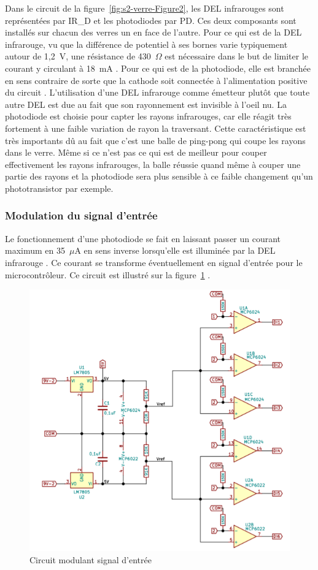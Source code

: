 Dans le circuit de la figure~\ref{fig:s2-verre-Figure2}, les DEL infrarouges sont représentées par IR\_D et les photodiodes par PD.
Ces deux composants sont installés sur chacun des verres un en face de l’autre.
Pour ce qui est de la DEL infrarouge, vu que la différence de potentiel à ses bornes varie typiquement autour de 1,2~V, une résistance de 430~$\Omega$ est nécessaire dans le but de limiter le courant y circulant à 18~mA \cite{everlight_americas_datasheet_2014}.
Pour ce qui est de la photodiode, elle est branchée en sens contraire de sorte que la cathode soit connectée à l’alimentation positive du circuit \cite{sharp_application_1999}.
L’utilisation d’une DEL infrarouge comme émetteur plutôt que toute autre DEL est due au fait que son rayonnement est invisible à l'oeil nu.
La photodiode est choisie pour capter les rayons infrarouges, car elle réagit très fortement à une faible variation de rayon la traversant.
Cette caractéristique est très importants dû au fait que c’est une balle de ping-pong qui coupe les rayons dans le verre.
Même si ce n’est pas ce qui est de meilleur pour couper effectivement les rayons infrarouges, la balle réussie quand même à couper une partie des rayons et la photodiode sera plus sensible à ce faible changement qu’un phototransistor par exemple.

\subsubsection{Modulation du signal d’entrée}

Le fonctionnement d’une photodiode se fait en laissant passer un courant maximum en 35~$\mu$A en sens inverse lorsqu’elle est illuminée par la DEL infrarouge \cite{everlight_americas_datasheet_2016}.
Ce courant se transforme éventuellement en signal d’entrée pour le microcontrôleur.
Ce circuit est illustré sur la figure~\ref{fig:s2-verre-Figure5} \cite{sharp_application_1999}.

\begin{figure}[t]
    \centering
    \includegraphics[width=0.8\linewidth]{img/s2/verre/Figure5}
    \caption{Circuit modulant signal d’entrée}
    \label{fig:s2-verre-Figure5}
\end{figure}

